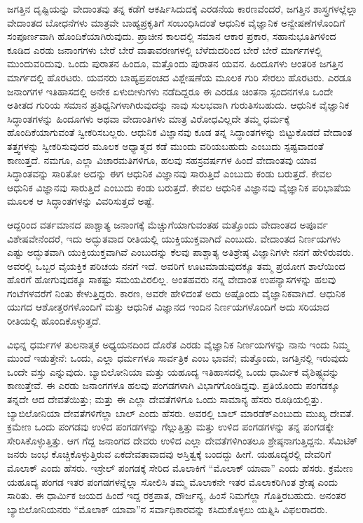 ಜಗತ್ತಿನ ದೃಷ್ಟಿಯನ್ನು ವೇದಾಂತವು ತನ್ನ ಕಡೆಗೆ ಆಕರ್ಷಿಸಿದುದಕ್ಕೆ ಎರಡನೆಯ ಕಾರಣವೆಂದರೆ, ಜಗತ್ತಿನ ಶಾಸ್ತ್ರಗಳಲ್ಲೆಲ್ಲಾ ವೇದಾಂತದ ಬೋಧನೆಗಳು ಮಾತ್ರವೇ ಬಾಹ್ಯಪ್ರಕೃತಿಗೆ ಸಂಬಂಧಿಸಿದಂತೆ ಆಧುನಿಕ ವೈಜ್ಞಾನಿಕ ಅನ್ವೇಷಣೆಗಳೊಂದಿಗೆ ಸಂಪೂರ್ಣವಾಗಿ ಹೊಂದಿಕೆಯಾಗಿರುವುದು. ಪ್ರಾಚೀನ ಕಾಲದಲ್ಲಿ ಸಮಾನ ಆಕಾರ ಪ್ರಕಾರ, ಸಹಾನುಭೂತಿಗಳಿಂದ ಕೂಡಿದ ಎರಡು ಜನಾಂಗಗಳು ಬೇರೆ ಬೇರೆ ವಾತಾವರಣಗಳಲ್ಲಿ ಬೆಳೆದುದರಿಂದ ಬೇರೆ ಬೇರೆ ಮಾರ್ಗಗಳಲ್ಲಿ ಮುಂದುವರಿದುವು. ಒಂದು ಪುರಾತನ ಹಿಂದೂ, ಮತ್ತೊಂದು ಪುರಾತನ ಯವನ. ಹಿಂದೂಗಳು ಆಂತರಿಕ ಜಗತ್ತಿನ ಮಾರ್ಗದಲ್ಲಿ ಹೊರಟರು. ಯವನರು ಬಾಹ್ಯ\-ಪ್ರಪಂಚದ ವಿಶ್ಲೇಷಣೆಯ ಮೂಲಕ ಗುರಿ ಸೇರಲು ಹೊರಟರು. ಎರಡೂ ಜನಾಂಗಗಳ ಇತಿಹಾಸದಲ್ಲಿ ಅನೇಕ ಏಳುಬೀಳುಗಳು ನಡೆದಿದ್ದರೂ ಈ ಎರಡೂ ಚಿಂತನಾ ಸ್ಪಂದನಗಳೂ ಒಂದೇ ಅತೀತದ ಗುರಿಯ ಸಮಾನ ಪ್ರತಿಧ್ವನಿಗಳಾಗಿರುವುದನ್ನು ನಾವು ಸುಲಭವಾಗಿ ಗುರುತಿಸಬಹುದು. ಆಧುನಿಕ ವೈಜ್ಞಾನಿಕ ಸಿದ್ಧಾಂತಗಳನ್ನು ಹಿಂದೂಗಳು ಅಥವಾ ವೇದಾಂತಿಗಳು ಮಾತ್ರ ವಿರೋಧವಿಲ್ಲದೇ ತಮ್ಮ ಧರ್ಮಕ್ಕೆ ಹೊಂದಿಕೆಯಾಗುವಂತೆ ಸ್ವೀಕರಿಸಬಲ್ಲರು. ಆಧುನಿಕ ವಿಜ್ಞಾನವು ಕೂಡ ತನ್ನ ಸಿದ್ಧಾಂತಗಳನ್ನು ಬಿಟ್ಟುಕೊಡದೆ ವೇದಾಂತ ತತ್ತ್ವಗಳನ್ನು ಸ್ವೀಕರಿಸುವುದರ ಮೂಲಕ ಅಧ್ಯಾತ್ಮದ ಕಡೆ ಮುಂದು ವರಿಯಬಹುದು ಎಂಬುದು ಸ್ಪಷ್ಟವಾದಂತೆ ಕಾಣುತ್ತದೆ. ನಮಗೂ, ಎಲ್ಲಾ ವಿಚಾರಮತಿಗಳಿಗೂ, ಹಲವು ಸಹಸ್ರವರ್ಷಗಳ ಹಿಂದೆ ವೇದಾಂತವು ಯಾವ ಸಿದ್ಧಾಂತವನ್ನು ಸಾರಿತೋ ಅದನ್ನು ಈಗ ಆಧುನಿಕ ವಿಜ್ಞಾನವು ಸಾರುತ್ತಿದೆ ಎಂಬುದು ಕಂಡು ಬರುತ್ತದೆ. ಕೇವಲ ಆಧುನಿಕ ವಿಜ್ಞಾನವು ಸಾರುತ್ತಿದೆ ಎಂಬುದು ಕಂಡು ಬರುತ್ತದೆ. ಕೇವಲ ಆಧುನಿಕ ವಿಜ್ಞಾನವು ವೈಜ್ಞಾನಿಕ ಪರಿಭಾಷೆಯ ಮೂಲಕ ಆ ಸಿದ್ಧಾಂತಗಳನ್ನು ವಿವರಿಸುತ್ತದೆ ಅಷ್ಟೆ. 

ಆದ್ದರಿಂದ ವರ್ತಮಾನದ ಪಾಶ್ಚಾತ್ಯ ಜನಾಂಗಕ್ಕೆ ಮೆಚ್ಚುಗೆಯಾಗುವಂತಹ ಮತ್ತೊಂದು ವೇದಾಂತದ ಅಪೂರ್ವ ವಿಶೇಷವೇನೆಂದರೆ, ಇದು ಅದ್ಭುತವಾದ ರೀತಿಯಲ್ಲಿ ಯುಕ್ತಿಯುಕ್ತವಾಗಿದೆ ಎಂಬುದು. ವೇದಾಂತದ ನಿರ್ಣಯಗಳು ಎಷ್ಟು ಅದ್ಭುತವಾಗಿ ಯುಕ್ತಿಯುಕ್ತವಾಗಿವೆ ಎಂಬುದನ್ನು ಕೆಲವು ಪಾಶ್ಚಾತ್ಯ ಅತಿಶ್ರೇಷ್ಠ ವಿಜ್ಞಾನಿಗಳೇ ನನಗೆ ಹೇಳಿರುವರು. ಅವರಲ್ಲಿ ಒಬ್ಬರ ವೈಯಕ್ತಿಕ ಪರಿಚಯ ನನಗೆ ಇದೆ. ಅವರಿಗೆ ಊಟಮಾಡುವುದಕ್ಕೂ ತಮ್ಮ ಪ್ರಯೋಗ ಶಾಲೆಯಿಂದ ಹೊರಗೆ ಹೋಗುವುದಕ್ಕೂ ಸಾಕಷ್ಟು ಸಮಯವಿರಲಿಲ್ಲ. ಅಂತಹವರು ನನ್ನ ವೇದಾಂತ ಉಪನ್ಯಾಸಗಳನ್ನು ಹಲವು ಗಂಟೆಗಳವರೆಗೆ ನಿಂತು ಕೇಳುತ್ತಿದ್ದರು. ಕಾರಣ, ಅವರೇ ಹೇಳಿದಂತೆ ಅದು ಅಷ್ಟೊಂದು ವೈಜ್ಞಾನಿಕವಾಗಿದೆ. ಆಧುನಿಕ ಯುಗದ ಆಶೋತ್ತರಗಳೊಂದಿಗೆ ಮತ್ತು ಆಧುನಿಕ ವಿಜ್ಞಾನದ ಇಂದಿನ ನಿರ್ಣಯಗಳೊಂದಿಗೆ ಅದು ಸರಿಯಾದ ರೀತಿಯಲ್ಲಿ ಹೊಂದಿಕೊಳ್ಳುತ್ತದೆ. 

ವಿಭಿನ್ನ ಧರ್ಮಗಳ ತುಲನಾತ್ಮಕ ಅಧ್ಯಯನದಿಂದ ದೊರೆತ ಎರಡು ವೈಜ್ಞಾನಿಕ ನಿರ್ಣಯಗಳನ್ನು ನಾನು ಇಂದು ನಿಮ್ಮ ಮುಂದೆ ಇಡುತ್ತೇನೆ: ಒಂದು, ಎಲ್ಲಾ ಧರ್ಮಗಳೂ ಸಾರ್ವತ್ರಿಕ ಎಂಬ ಭಾವನೆ; ಮತ್ತೊಂದು, ಜಗತ್ತಿನಲ್ಲಿ ಇರುವುದು ಒಂದೇ ವಸ್ತು ಎನ್ನುವುದು. ಬ್ಯಾಬಿಲೋನಿಯಾ ಮತ್ತು ಯಹೂದ್ಯ ಇತಿಹಾಸದಲ್ಲಿ ಒಂದು ಧಾರ್ಮಿಕ ವೈಶಿಷ್ಟ್ಯವನ್ನು ಕಾಣುತ್ತೇವೆ. ಈ ಎರಡು ಜನಾಂಗಗಳೂ ಹಲವು ಪಂಗಡಗಳಾಗಿ ವಿಭಾಗಗೊಂಡಿದ್ದವು. ಪ್ರತಿಯೊಂದು ಪಂಗಡಕ್ಕೂ ತನ್ನದೇ ಆದ ದೇವತೆಯಿತ್ತು; ಮತ್ತು ಈ ಎಲ್ಲಾ ದೇವತೆಗಳಿಗೂ ಒಂದು ಸಾಮಾನ್ಯ ಹೆಸರು ರೂಢಿಯಲ್ಲಿತ್ತು. ಬ್ಯಾಬಿಲೋನಿಯಾ ದೇವತೆಗಳಿಗೆಲ್ಲಾ ಬಾಲ್​ ಎಂದು ಹೆಸರು. ಅವರಲ್ಲಿ ಬಾಲ್​ ಮಾರಡೆಕ್​ ಎಂಬುದು ಮುಖ್ಯ ದೇವತೆ. ಕ್ರಮೇಣ ಒಂದು ಪಂಗಡವು ಉಳಿದ ಪಂಗಡಗಳನ್ನು ಗೆಲ್ಲುತ್ತಿತ್ತು ಮತ್ತು ಉಳಿದ ಪಂಗಡಗಳನ್ನು ತನ್ನ ಪಂಗಡಕ್ಕೇ ಸೇರಿಸಿಕೊಳ್ಳುತ್ತಿತ್ತು. ಆಗ ಗೆದ್ದ ಜನಾಂಗದ ದೇವರು ಉಳಿದ ಎಲ್ಲಾ ದೇವತೆಗಳಿಗಿಂತಲೂ ಶ್ರೇಷ್ಠನಾಗುತ್ತಿದ್ದನು. ಸೆಮಿಟಿಕ್​ ಜನರು ಜಂಭ ಕೊಚ್ಚಿಕೊಳ್ಳುತ್ತಿರುವ ಏಕದೇವತಾವಾದವು ಅಸ್ತಿತ್ವಕ್ಕೆ ಬಂದದ್ದು ಹೀಗೆ. ಯಹೂದ್ಯರಲ್ಲಿ ದೇವರಿಗೆ ಮೊಲಾಕ್​ ಎಂದು ಹೆಸರು. ಇಸ್ರೇಲ್​ ಪಂಗಡಕ್ಕೆ ಸೇರಿದ ಮೊಲಾಕಿಗೆ “ಮೊಲಾಕ್​ ಯಾವಾ” ಎಂದು ಹೆಸರು. ಕ್ರಮೇಣ ಯಹೂದ್ಯ ಪಂಗಡ ಇತರ ಪಂಗಡಗಳನ್ನೆಲ್ಲಾ ಸೋಲಿಸಿ ತಮ್ಮ ಮೊಲಾಕನೇ ಇತರ ಮೊಲಾಕರಿಗಿಂತ ಶ್ರೇಷ್ಠ ಎಂದು ಸಾರಿತು. ಈ ಧಾರ್ಮಿಕ ಜಯದ ಹಿಂದೆ ಇದ್ದ ರಕ್ತಪಾತ, ದೌರ್ಜನ್ಯ, ಹಿಂಸೆ ನಿಮಗೆಲ್ಲಾ ಗೊತ್ತಿರಬಹುದು. ಅನಂತರ ಬ್ಯಾಬಿಲೋನಿಯನರು “ಮೊಲಾಕ್​ ಯಾವಾ”ನ ಸರ್ವಾಧಿಕಾರವನ್ನು ಕಸಿದುಕೊಳ್ಳಲು ಯತ್ನಿಸಿ ವಿಫಲರಾದರು. 

